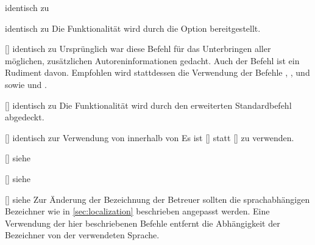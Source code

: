 \begin{Bundle*}{}
\begin{Declaration}{}{%
  identisch zu %
}
\begin{Declaration}{}{%
  identisch zu %
}
\printdeclarationlist%
%
Die Funktionalität wird durch die Option  bereitgestellt.
\end{Declaration}
\end{Declaration}

\begin{Declaration}{[]}{%
  identisch zu %
}
\printdeclarationlist%
%
Ursprünglich war diese Befehl für das Unterbringen aller möglichen, 
zusätzlichen Autoreninformationen gedacht. Auch der Befehl  
ist ein Rudiment davon. Empfohlen wird stattdessen die Verwendung der Befehle 
, ,  und 
 sowie  und .
\end{Declaration}

\begin{Declaration}{[]}{%
  identisch zu %
}
\printdeclarationlist%
%
Die Funktionalität wird durch den erweiterten Standardbefehl  
abgedeckt.
\end{Declaration}

\begin{Declaration}{[]}{%
  identisch zur Verwendung von  innerhalb von %
}
\printdeclarationlist%
%
Es ist []
statt [] zu verwenden.
\end{Declaration}

\begin{Declaration}{[]}{%
  siehe %
}
\begin{Declaration}{[]}{%
  siehe %
}
\begin{Declaration}{[]}{%
  siehe %
}
\printdeclarationlist%
%
Zur Änderung der Bezeichnung der Betreuer sollten die sprachabhängigen 
Bezeichner wie in \autoref{sec:localization} beschrieben angepasst werden. Eine 
Verwendung der hier beschriebenen Befehle entfernt die Abhängigkeit der 
Bezeichner von der verwendeten Sprache.
\end{Declaration}
\end{Declaration}
\end{Declaration}


\end{Bundle*}
